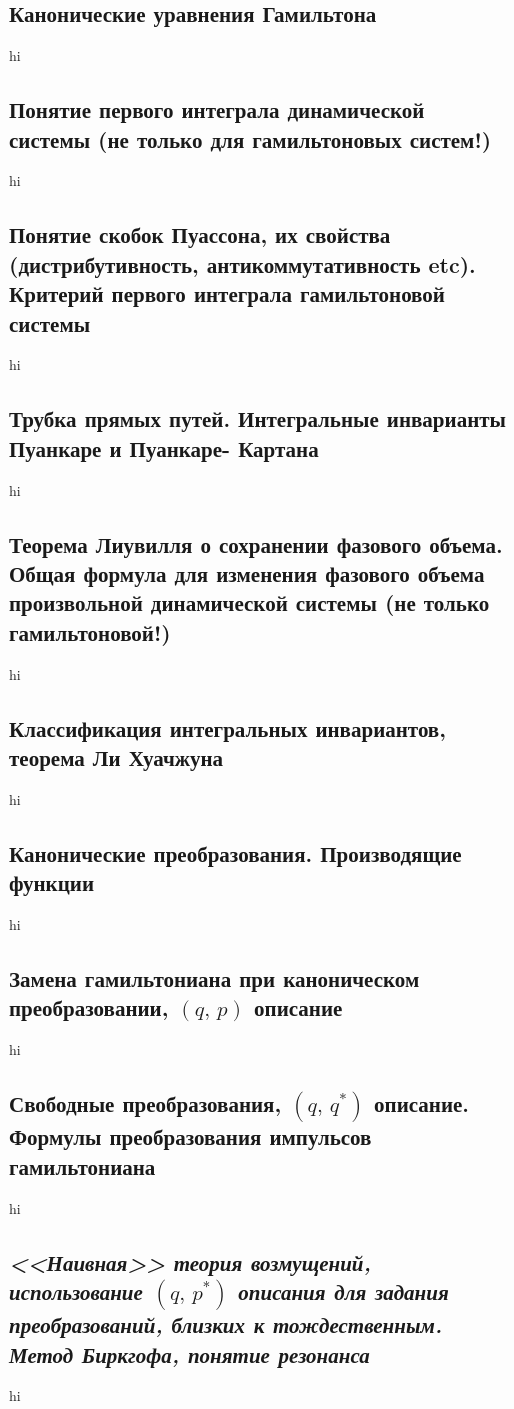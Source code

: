 \documentclass[a4paper,12pt]{article}
\begin{document}
\subsection{Канонические уравнения Гамильтона}
hi
\subsection{Понятие первого интеграла динамической системы (не только для
гамильтоновых систем!)}
hi
\subsection{Понятие скобок Пуассона, их свойства (дистрибутивность,
антикоммутативность etc). Критерий первого интеграла гамильтоновой
системы}
hi
\subsection{Трубка прямых путей. Интегральные инварианты Пуанкаре и Пуанкаре-
Картана}
hi
\subsection{Теорема Лиувилля о сохранении фазового объема. Общая формула для
изменения фазового объема произвольной динамической системы (не только
гамильтоновой!)}
hi
\subsection{Классификация интегральных инвариантов, теорема Ли Хуачжуна}
hi
\subsection{Канонические преобразования. Производящие функции}
hi
\subsection{Замена гамильтониана при каноническом преобразовании, $(q,\,p)$ 
описание}
hi
\subsection{Свободные  преобразования, $(q,\,q^*)$ описание. Формулы
	преобразования
импульсов гамильтониана}
hi
\subsection{\emph{<<Наивная>> теория возмущений, использование $(q,\,p^*)$ описания
для задания преобразований, близких к тождественным. Метод Биркгофа, понятие
резонанса}}
hi
\end{document}
